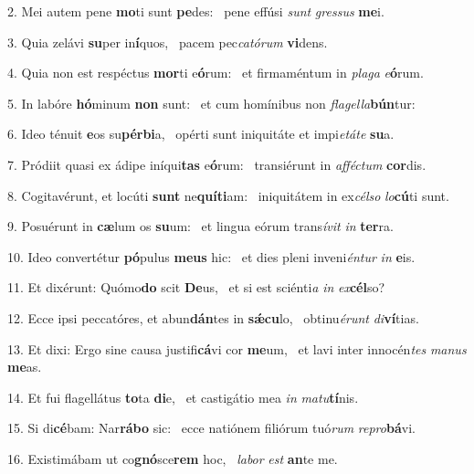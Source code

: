2. Mei autem pene \textbf{mo}ti sunt \textbf{pe}des: \ast\  pene effúsi \textit{sunt} \textit{gres}\textit{sus} \textbf{me}i.\

3. Quia zelávi \textbf{su}per in\textbf{í}quos, \ast\  pacem pec\textit{ca}\textit{tó}\textit{rum} \textbf{vi}dens.\

4. Quia non est respéctus \textbf{mor}ti e\textbf{ó}rum: \ast\  et firmaméntum in \textit{pla}\textit{ga} \textit{e}\textbf{ó}rum.\

5. In labóre \textbf{hó}minum \textbf{non} sunt: \ast\  et cum homínibus non \textit{fla}\textit{gel}\textit{la}\textbf{bún}tur:\

6. Ideo ténuit \textbf{e}os su\textbf{pér}\textbf{bi}a, \ast\  opérti sunt iniquitáte et impi\textit{e}\textit{tá}\textit{te} \textbf{su}a.\

7. Pródiit quasi ex ádipe iníqui\textbf{tas} e\textbf{ó}rum: \ast\  transiérunt in \textit{af}\textit{féc}\textit{tum} \textbf{cor}dis.\

8. Cogitavérunt, et locúti \textbf{sunt} ne\textbf{quí}\textbf{ti}am: \ast\  iniquitátem in ex\textit{cél}\textit{so} \textit{lo}\textbf{cú}ti sunt.\

9. Posuérunt in \textbf{cæ}lum os \textbf{su}um: \ast\  et lingua eórum trans\textit{í}\textit{vit} \textit{in} \textbf{ter}ra.\

10. Ideo convertétur \textbf{pó}pulus \textbf{me}\textbf{us} hic: \ast\  et dies pleni inveni\textit{én}\textit{tur} \textit{in} \textbf{e}is.\

11. Et dixérunt: Quómo\textbf{do} scit \textbf{De}us, \ast\  et si est sciénti\textit{a} \textit{in} \textit{ex}\textbf{cél}so?\

12. Ecce ipsi peccatóres, et abun\textbf{dán}tes in \textbf{sǽ}\textbf{cu}lo, \ast\  obtinu\textit{é}\textit{runt} \textit{di}\textbf{ví}tias.\

13. Et dixi: Ergo sine causa justifi\textbf{cá}vi cor \textbf{me}um, \ast\  et lavi inter innocén\textit{tes} \textit{ma}\textit{nus} \textbf{me}as.\

14. Et fui flagellátus \textbf{to}ta \textbf{di}e, \ast\  et castigátio mea \textit{in} \textit{ma}\textit{tu}\textbf{tí}nis.\

15. Si di\textbf{cé}bam: Nar\textbf{rá}\textbf{bo} sic: \ast\  ecce natiónem filiórum tuó\textit{rum} \textit{re}\textit{pro}\textbf{bá}vi.\

16. Existimábam ut co\textbf{gnó}sce\textbf{rem} hoc, \ast\  \textit{la}\textit{bor} \textit{est} \textbf{an}te me.\


